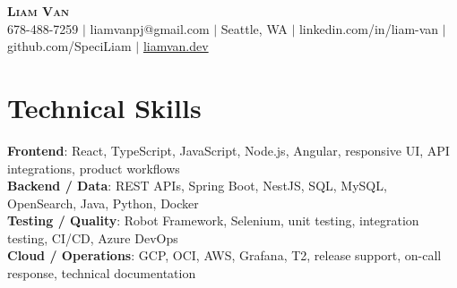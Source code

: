 \documentclass[letterpaper,11pt]{article}
\begin{document}

%
\begin{center}
    \textbf{\Huge \scshape Liam Van} \\ \vspace{1pt}
    \small 678-488-7259 $|$ \small {liamvanpj@gmail.com} $|$ Seattle, WA
 {{$|$ linkedin.com/in/liam-van} {$|$ github.com/SpeciLiam} {$|$ \href{https://liamvan.dev}{liamvan.dev}}}

\end{center}

\section{Technical Skills}
 \begin{itemize}[leftmargin=0.15in, label={}]
    \small{\item{
     \textbf{Frontend}{: React, TypeScript, JavaScript, Node.js, Angular, responsive UI, API integrations, product workflows} \\
     \textbf{Backend / Data}{: REST APIs, Spring Boot, NestJS, SQL, MySQL, OpenSearch, Java, Python, Docker} \\
     \textbf{Testing / Quality}{: Robot Framework, Selenium, unit testing, integration testing, CI/CD, Azure DevOps} \\
     \textbf{Cloud / Operations}{: GCP, OCI, AWS, Grafana, T2, release support, on-call response, technical documentation} \\
    }}
 \end{itemize}
%
\end{document}
